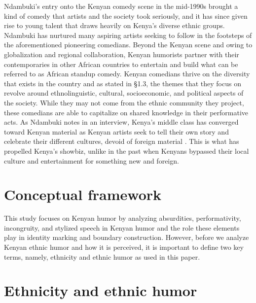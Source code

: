 \documentclass[output=paper]{langsci/langscibook}
\begin{document}
   Ndambuki’s entry onto the Kenyan comedy scene in the mid-1990s brought a kind of comedy that artists and the society took seriously, and it has since given rise to young talent that draws heavily on Kenya’s diverse ethnic groups. Ndambuki has nurtured many aspiring artists seeking to follow in the footsteps of the aforementioned pioneering comedians. Beyond the Kenyan scene and owing to globalization and regional collaboration, Kenyan humorists partner with their contemporaries in other African countries to entertain and build what can be referred to as African standup comedy. Kenyan comedians thrive on the diversity that exists in the country and as stated in §1.3, the themes that they focus on revolve around ethnolinguistic, cultural, socioeconomic, and political aspects of the society. While they may not come from the ethnic community they project, these comedians are able to capitalize on shared knowledge in their performative acts. As Ndambuki notes in an interview\textit{, }Kenya’s middle class has converged toward Kenyan material as Kenyan artists seek to tell their own story and celebrate their different cultures, devoid of foreign material \citep{Kimani2014}. This is what has propelled Kenya’s showbiz, unlike in the past when Kenyans bypassed their local culture and entertainment for something new and foreign. 

\section{Conceptual framework}

   This study focuses on Kenyan humor by analyzing absurdities, performativity, incongruity, and stylized speech in Kenyan humor and the role these elements play in identity marking and boundary construction. However, before we analyze Kenyan ethnic humor and how it is perceived, it is important to define two key terms, namely, ethnicity and ethnic humor as used in this paper.

\section{Ethnicity and ethnic humor}
\end{document}
